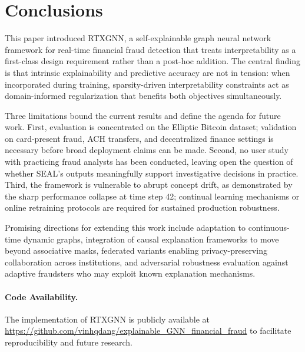 \section{Conclusions}
\label{sec:conclusions}

This paper introduced RTXGNN, a self-explainable graph neural network framework 
for real-time financial fraud detection that treats interpretability as a 
first-class design requirement rather than a post-hoc addition. The central 
finding is that intrinsic explainability and predictive accuracy are not in 
tension: when incorporated during training, sparsity-driven interpretability 
constraints act as domain-informed regularization that benefits both objectives 
simultaneously.

Three limitations bound the current results and define the agenda for future 
work. First, evaluation is concentrated on the Elliptic Bitcoin dataset; 
validation on card-present fraud, ACH transfers, and decentralized finance 
settings is necessary before broad deployment claims can be made. Second, no 
user study with practicing fraud analysts has been conducted, leaving open the 
question of whether SEAL's outputs meaningfully support investigative decisions 
in practice. Third, the framework is vulnerable to abrupt concept drift, as 
demonstrated by the sharp performance collapse at time step 42; continual 
learning mechanisms or online retraining protocols are required for sustained 
production robustness.

Promising directions for extending this work include adaptation to 
continuous-time dynamic graphs, integration of causal explanation frameworks 
to move beyond associative masks, federated variants enabling privacy-preserving 
collaboration across institutions, and adversarial robustness evaluation against 
adaptive fraudsters who may exploit known explanation mechanisms.

\paragraph{Code Availability.} The implementation of RTXGNN is publicly 
available at \url{https://github.com/vinhqdang/explainable_GNN_financial_fraud} 
to facilitate reproducibility and future research.